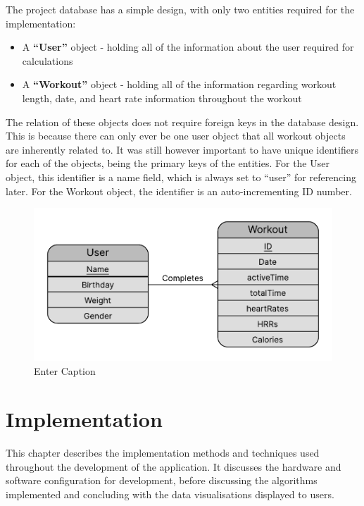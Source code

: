 \documentclass{l4proj}
\begin{document}
The project database has a simple design, with only two entities required for the implementation:

\begin{itemize}
    \item A \textbf{“User”} object - holding all of the information about the user required for calculations
    \item A \textbf{“Workout”} object - holding all of the information regarding workout length, date, and heart rate information throughout the workout
\end{itemize}

The relation of these objects does not require foreign keys in the database design. This is because there can only ever be one user object that all workout objects are inherently related to. It was still however important to have unique identifiers for each of the objects, being the primary keys of the entities. For the User object, this identifier is a name field, which is always set to “user” for referencing later. For the Workout object, the identifier is an auto-incrementing ID number.

\begin{figure}[h]
    \centering
    \includegraphics[width=0.75\linewidth]{dissertation//dissImages/ERDiagram.pdf}
    \caption{Enter Caption}
    \label{fig:enter-label}
\end{figure}

\chapter{Implementation}
\label{sec:implementation}

This chapter describes the implementation methods and techniques used throughout the development of the application. It discusses the hardware and software configuration for development, before discussing the algorithms implemented and concluding with the data visualisations displayed to users.
\end{document}
